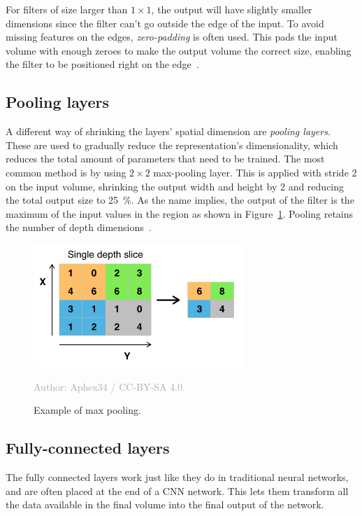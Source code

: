 \documentclass{kththesis}
\newcommand{\source}[1]{\vspace{-5mm}\caption*{\textcolor{darkgray}{Author: {#1}}\vspace{-7mm}} }
\begin{document}
For filters of size larger than $1 \times 1$, the output will have slightly smaller dimensions since the filter can't go outside the edge of the input. To avoid missing features on the edges, \textit{zero-padding} is often used. This pads the input volume with enough zeroes to make the output volume the correct size, enabling the filter to be positioned right on the edge~\cite{cnnIntro}.

\subsection{Pooling layers}
A different way of shrinking the layers' spatial dimension are \textit{pooling layers}. These are used to gradually reduce the representation's dimensionality, which reduces the total amount of parameters that need to be trained. The most common method is by using $2\times 2$ max-pooling layer. This is applied with stride 2 on the input volume, shrinking the output width and height by 2 and reducing the total output size to 25~\%. As the name implies, the output of the filter is the maximum of the input values in the region as shown in Figure~\ref{fig:max_pooling}. Pooling retains the number of depth dimensions~\cite{cnnIntro}.

\begin{figure}
  \begin{center}
    \includegraphics[width=80mm]{img/max_pooling.png}
    \caption{Example of max pooling.}
    \source{Aphex34 / CC-BY-SA 4.0.}
    \label{fig:max_pooling}
  \end{center}
\end{figure}

\subsection{Fully-connected layers}
The fully connected layers work just like they do in traditional neural networks, and are often placed at the end of a CNN network. This lets them transform all the data available in the final volume into the final output of the network.
\end{document}
